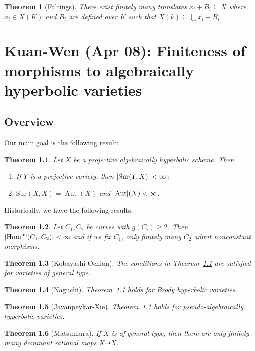 \documentclass[leqno, openany]{memoir}
\newtheorem{thm}{Theorem}[section]
\theoremstyle{definition}
\theoremstyle{remark}
\theoremstyle{plain}
\theoremstyle{definition}
\theoremstyle{remark}
\newcommand{\mr}[1]{\mathrm{#1}}
\DeclareMathOperator{\Hom}{Hom}
\DeclareMathOperator{\Aut}{Aut}
\begin{document}
\begin{thm}[Faltings]
    There exist finitely many translates $x_i + B_i \subseteq X$ where $x_i \in X(K)$ and $B_i$ are defined over $K$ such that $X(k) \subseteq \bigcup x_i + B_i$. 
\end{thm}

\chapter{Kuan-Wen (Apr 08): Finiteness of morphisms to algebraically hyperbolic varieties}%

\section{Overview}

Our main goal is the following result:

\begin{thm}\label{thm:surj}
    Let $X$ be a projective algebraically hyperbolic scheme. Then
    \begin{enumerate}[(1)]
        \item If $Y$ is a projective variety, then $\abs{\mr{Sur}(Y, X)} < \infty$;
        \item $\mr{Sur}(X, X) = \Aut(X)$ and $\abs{\Aut}(X) < \infty$.
    \end{enumerate}
\end{thm}


Historically, we have the following results.
\begin{thm}
    Let $C_1, C_2$ be curves with $g(C_i) \geq 2$. Then $\abs{\Hom^{\mr{nc}}(C_1, C_2)} < \infty$ and if we fix $C_1$, only finitely many $C_2$ admit nonconstant morphisms.
\end{thm}

\begin{thm}[Kobayashi-Ochion]
    The conditions in Theorem~\ref{thm:surj} are satisfied for varieties of general type.
\end{thm}

\begin{thm}[Naguchi]
    Theorem~\ref{thm:surj} holds for Brody hyperbolic varieties.
\end{thm}

\begin{thm}[Javanpeykar-Xie]
    Theorem~\ref{thm:surj} holds for pseudo-algebraically hyperbolic varieties.
\end{thm}

\begin{thm}[Matsumura]
    If $X$ is of general type, then there are only finitely many dominant rational maps $X \dashrightarrow X$.
\end{thm}
\end{document}
